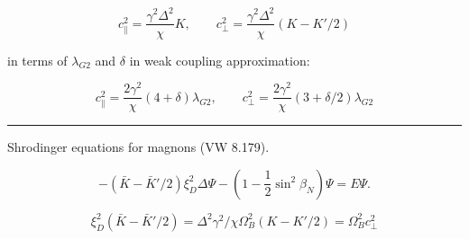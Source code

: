 \documentclass[a4paper]{article}
\begin{document}
$$
c_\parallel^2 = \frac{\gamma^2 \Delta^2}{\chi} K,\qquad
c_\perp^2 = \frac{\gamma^2 \Delta^2}{\chi} (K-K'/2)
$$

in terms of $\lambda_{G2}$ and $\delta$ in weak coupling approximation:

$$
c_\parallel^2 = \frac{2\gamma^2}{\chi} (4+\delta)\lambda_{G2},\qquad
c_\perp^2     = \frac{2\gamma^2}{\chi} (3+\delta/2)\lambda_{G2}
$$

\hrule
\medskip

Shrodinger equations for magnons (VW 8.179).

$$
-(\bar K - \bar K'/2)\xi_D^2 \Delta\Psi - (1- \frac12 \sin^2\beta_N) \Psi = E \Psi.
$$

$$
\xi_D^2 (\bar K- \bar K'/2) = \Delta^2 \gamma^2/\chi \Omega_B^2 (K-K'/2)
=\Omega_B^2 c_\perp^2
$$
\end{document}
